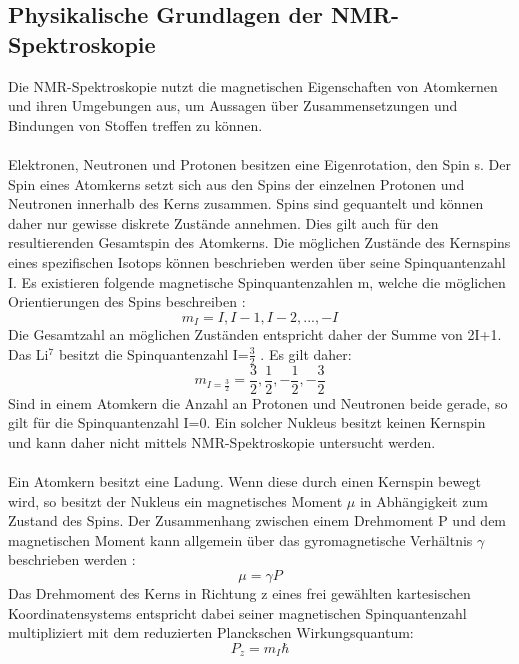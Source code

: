 \documentclass[a4paper, 11pt, headsepline,footsepline,twoside,abstract]{scrbook}
\begin{document}
\subsection{Physikalische Grundlagen der NMR-Spektroskopie}
Die NMR-Spektroskopie nutzt die magnetischen Eigenschaften von Atomkernen und ihren Umgebungen aus, um Aussagen über Zusammensetzungen und Bindungen von Stoffen treffen zu können.
\\\\
Elektronen, Neutronen und Protonen besitzen eine Eigenrotation, den Spin s. Der Spin eines Atomkerns setzt sich aus den Spins der einzelnen Protonen und Neutronen innerhalb des Kerns zusammen. Spins sind gequantelt und können daher nur gewisse diskrete Zustände annehmen. Dies gilt auch für den resultierenden Gesamtspin des Atomkerns. Die möglichen Zustände des Kernspins eines spezifischen Isotops können beschrieben werden über seine Spinquantenzahl I. Es existieren folgende magnetische Spinquantenzahlen m, welche die möglichen Orientierungen des Spins beschreiben \cite{Gerthsen2015}:
\begin{equation}
m_I = I, I-1, I-2, ..., -I
\end{equation}
Die Gesamtzahl an möglichen Zuständen entspricht daher der Summe von 2I+1. Das Li$^7$ besitzt die Spinquantenzahl I=$\frac{3}{2}$ \cite{Fitzgerald1999}. Es gilt daher:
\begin{equation}
m_{I=\frac{3}{2}} = \frac{3}{2}, \frac{1}{2}, -\frac{1}{2}, -\frac{3}{2}
\end{equation}
Sind in einem Atomkern die Anzahl an Protonen und Neutronen beide gerade, so gilt für die Spinquantenzahl I=0. Ein solcher Nukleus besitzt keinen Kernspin und kann daher nicht mittels NMR-Spektroskopie untersucht werden.
\\\\
Ein Atomkern besitzt eine Ladung. Wenn diese durch einen Kernspin bewegt wird, so besitzt der Nukleus ein magnetisches Moment $\mu$ in Abhängigkeit zum Zustand des Spins. Der Zusammenhang zwischen einem Drehmoment P und dem magnetischen Moment kann allgemein über das gyromagnetische Verhältnis $\gamma$ beschrieben werden \cite{Guenther2013}: 
\begin{equation}
\mu = \gamma P
\end{equation}
Das Drehmoment des Kerns in Richtung z eines frei gewählten kartesischen Koordinatensystems entspricht dabei seiner magnetischen Spinquantenzahl multipliziert mit dem reduzierten Planckschen Wirkungsquantum:
\begin{equation}
P_z = m_I \hbar
\label{magnMoment}
\end{equation}
\end{document}
